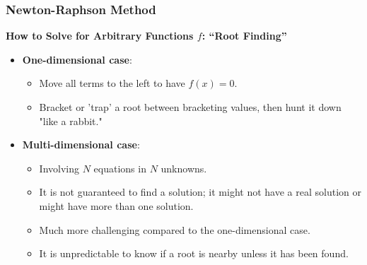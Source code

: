 \begin{frame}[fragile]
    \frametitle{Newton-Raphson Method}

    \textbf{How to Solve for Arbitrary Functions \( f \): “Root Finding”}

    \begin{itemize}
        \item \textbf{One-dimensional case}:
            \begin{itemize}
                \item Move all terms to the left to have \( f(x) = 0 \).
                \item Bracket or 'trap' a root between bracketing values, then hunt it down "like a rabbit."
            \end{itemize}
        
        \item \textbf{Multi-dimensional case}:
            \begin{itemize}
                \item Involving \( N \) equations in \( N \) unknowns.
                \item It is not guaranteed to find a solution; it might not have a real solution or might have more than one solution.
                \item Much more challenging compared to the one-dimensional case.
                \item It is unpredictable to know if a root is nearby unless it has been found.
            \end{itemize}
    \end{itemize}
\end{frame}


